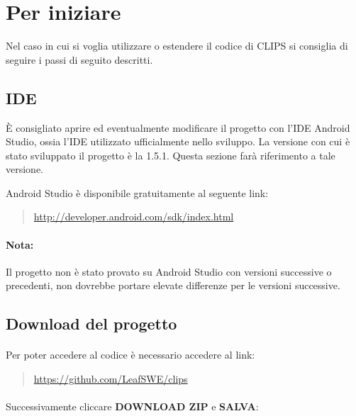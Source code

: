 \documentclass[../ManualeSviluppatore.tex]{subfiles}
\begin{document}
\section{Per iniziare}

	Nel caso in cui si voglia utilizzare o estendere il codice di CLIPS si consiglia di seguire i passi di seguito descritti.

	\subsection{IDE}
		È consigliato aprire ed eventualmente modificare il progetto con l'IDE \gls{Android Studio}, ossia l'IDE utilizzato ufficialmente nello sviluppo. La versione con cui è stato sviluppato il progetto è la 1.5.1. Questa sezione farà riferimento a tale versione.
		
	 \gls{Android Studio} è disponibile gratuitamente al seguente link:
		\begin{quote}
			\centering
			\url{http://developer.android.com/sdk/index.html}
		\end{quote}
		
		\paragraph*{Nota:} 
			Il progetto non è stato provato su \gls{Android Studio} con versioni successive o precedenti, non dovrebbe portare elevate differenze per le versioni successive.
		
		
		
		
	\subsection{Download del progetto}
		\paragraph*{}
			Per poter accedere al codice è necessario accedere al link:
		\begin{quote}
			\centering
			\url{https://github.com/LeafSWE/clips}
		\end{quote}

		\paragraph*{}
			Successivamente cliccare \textbf{DOWNLOAD ZIP} e \textbf{SALVA}:
			
\end{document}
